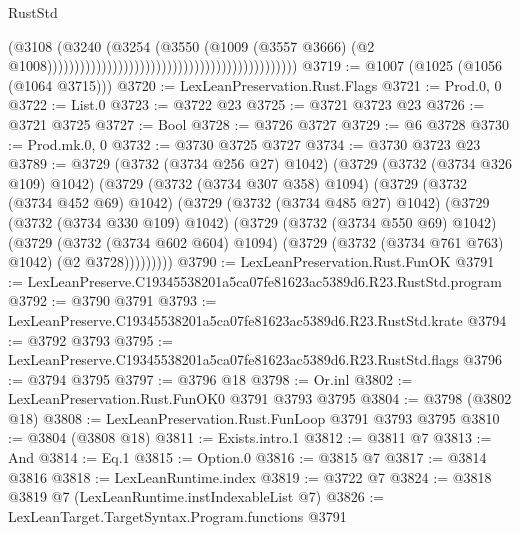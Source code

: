 \begin{lexlean}{RustStd}
\begin{coremodule}
                                                                                    (@3108
                                                                                      (@3240
                                                                                        (@3254
                                                                                          (@3550
                                                                                            (@1009
                                                                                              (@3557
                                                                                                @3666)
                                                                                              (@2
                                                                                                @1008))))))))))))))))))))))))))))))))))))))))))))))
@3719 := @1007 (@1025 (@1056 (@1064 @3715)))
@3720 := LexLeanPreservation.Rust.Flags
@3721 := Prod.{0, 0}
@3722 := List.{0}
@3723 := @3722 @23
@3725 := @3721 @3723 @23
@3726 := @3721 @3725
@3727 := Bool
@3728 := @3726 @3727
@3729 := @6 @3728
@3730 := Prod.mk.{0, 0}
@3732 := @3730 @3725 @3727
@3734 := @3730 @3723 @23
@3789 := @3729
    (@3732 (@3734 @256 @27) @1042)
    (@3729
      (@3732 (@3734 @326 @109) @1042)
      (@3729
        (@3732 (@3734 @307 @358) @1094)
        (@3729
          (@3732 (@3734 @452 @69) @1042)
          (@3729
            (@3732 (@3734 @485 @27) @1042)
            (@3729
              (@3732 (@3734 @330 @109) @1042)
              (@3729
                (@3732 (@3734 @550 @69) @1042)
                (@3729
                  (@3732 (@3734 @602 @604) @1094)
                  (@3729 (@3732 (@3734 @761 @763) @1042) (@2 @3728)))))))))
@3790 := LexLeanPreservation.Rust.FunOK
@3791 := LexLeanPreserve.C19345538201a5ca07fe81623ac5389d6.R23.RustStd.program
@3792 := @3790 @3791
@3793 := LexLeanPreserve.C19345538201a5ca07fe81623ac5389d6.R23.RustStd.krate
@3794 := @3792 @3793
@3795 := LexLeanPreserve.C19345538201a5ca07fe81623ac5389d6.R23.RustStd.flags
@3796 := @3794 @3795
@3797 := @3796 @18
@3798 := Or.inl
@3802 := LexLeanPreservation.Rust.FunOK0 @3791 @3793 @3795
@3804 := @3798 (@3802 @18)
@3808 := LexLeanPreservation.Rust.FunLoop @3791 @3793 @3795
@3810 := @3804 (@3808 @18)
@3811 := Exists.intro.{1}
@3812 := @3811 @7
@3813 := And
@3814 := Eq.{1}
@3815 := Option.{0}
@3816 := @3815 @7
@3817 := @3814 @3816
@3818 := LexLeanRuntime.index
@3819 := @3722 @7
@3824 := @3818 @3819 @7 (LexLeanRuntime.instIndexableList @7)
@3826 := LexLeanTarget.TargetSyntax.Program.functions @3791

\end{coremodule}
\end{lexlean}
